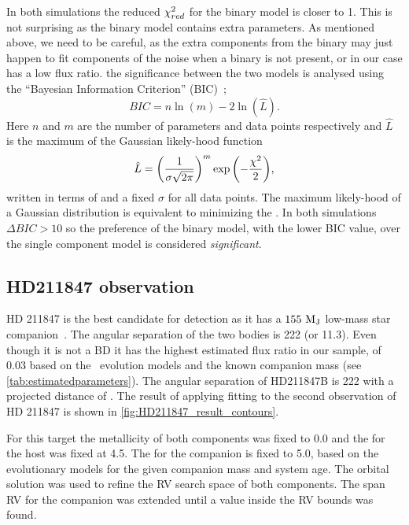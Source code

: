 In both simulations the reduced \({\chi}^{2}_{red}\) for the binary model is closer to 1.
This is not surprising as the binary model contains extra parameters.
As mentioned above, we need to be careful, as the extra components from the binary may just happen to fit components of the noise when a binary is not present, or in our case has a low flux ratio.
{\red{} the significance between the two models is analysed using the ``Bayesian Information Criterion'' ({BIC})~\citep{schwarz_estimating_1978}; }
\begin{equation}
{BIC} = n\ln{(m)} - 2\ln{(\hat{L})}.
\end{equation}
{\red{} Here \(n\) and \(m\) are the number of parameters and data points respectively and \(\hat{L}\) is the maximum of the Gaussian likely-hood function}
\begin{equation}
\hat{L} = {\left(\frac{1}{\sigma \sqrt{2\pi}}\right)}^{m} \exp{\left(-\frac{{\chi}^{2}}{2}\right)},
\end{equation}
{\red{} written in terms of \textchisquared{} and a fixed \(\sigma\) for all data points.
The maximum likely-hood of a Gaussian distribution is equivalent  to minimizing the \textchisquared.
In both simulations \(\Delta {BIC} >10\) so the preference of the binary model, with the lower {BIC} value, over the single component model is considered \emph{significant}.}

\subsection{HD211847 observation}
\label{subsec:results-hd211847}
{HD 211847} is the best candidate for detection as it has a \(\rm 155~M_J\) low-mass star companion~\citet{moutou_eccentricity_2017}.
The angular separation of the two bodies is 222\mas{} (or 11.3\AU).
Even though it is not a {BD} it has the highest estimated flux ratio in our sample, of 0.03 based on the~\citet{baraffe_new_2015} evolution models and the known companion mass (see \cref{tab:estimatedparameters}).
The angular separation of HD211847B is 222\mas{} with a projected distance of .
The result of applying \textchisquared{} fitting to the second observation of {HD 211847} is shown in \cref{fig:HD211847_result_contours}.

For this target the metallicity of both components was fixed to 0.0 and the \logg{} for the host was fixed at 4.5.
The \logg{} for the companion is fixed to 5.0, based on the~\citet{baraffe_new_2015} evolutionary models for the given companion mass and system age.
The orbital solution was used to refine the {RV} search space of both components.
The span {RV} for the companion was extended until a value inside the {RV} bounds was found.

